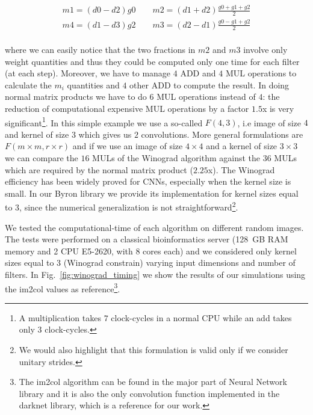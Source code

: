 \documentclass{standalone}
\begin{document}
\begin{equation}
\begin{aligned}
m1 = (d0 - d2)g0\quad\quad m2 = (d1 + d2)\frac{g0 + g1 + g2}{2}
\\
m4 = (d1 - d3)g2\quad\quad m3 = (d2 - d1)\frac{g0 - g1 + g2}{2}
\end{aligned}
\end{equation}
\\
where we can easily notice that the two fractions in $m2$ and $m3$ involve only weight quantities and thus they could be computed only one time for each filter (at each step).
Moreover, we have to manage $4$ \textsf{ADD} and $4$ \textsf{MUL} operations to calculate the $m_i$ quantities and $4$ other ADD to compute the result.
In doing normal matrix products we have to do $6$ \textsf{MUL} operations instead of $4$: the reduction of computational expensive \textsf{MUL} operations by a factor $1.5$x is very significant\footnote{
  A multiplication takes $7$ clock-cycles in a normal CPU while an add takes only $3$ clock-cycles.
}.
In this simple example we use a so-called $F(4, 3)$, i.e image of size $4$ and kernel of size $3$ which gives us $2$ convolutions.
More general formulations are $F(m\times m, r \times r)$ and if we use an image of size $4\times4$ and a kernel of size $3\times3$ we can compare the $16$ \textsf{MUL}s of the \textsf{Winograd} algorithm against the $36$ \textsf{MUL}s which are required by the normal matrix product ($2.25$x).
The \textsf{Winograd} efficiency has been widely proved for CNNs, especially when the kernel size is small.
In our \textsf{Byron} library we provide its implementation for kernel sizes equal to $3$, since the numerical generalization is not straightforward\footnote{
  We would also highlight that this formulation is valid only if we consider unitary strides.
}.

We tested the computational-time of each algorithm on different random images.
The tests were performed on a classical bioinformatics server (128~GB RAM memory and 2 CPU E5-2620, with 8 cores each) and we considered only kernel sizes equal to $3$ (\textsf{Winograd} constrain) varying input dimensions and number of filters.
In Fig.~\ref{fig:winograd_timing} we show the results of our simulations using the \textsf{im2col} values as reference\footnote{
  The \textsf{im2col} algorithm can be found in the major part of Neural Network library and it is also the only convolution function implemented in the \textsf{darknet} library, which is a reference for our work.
}.
\end{document}
